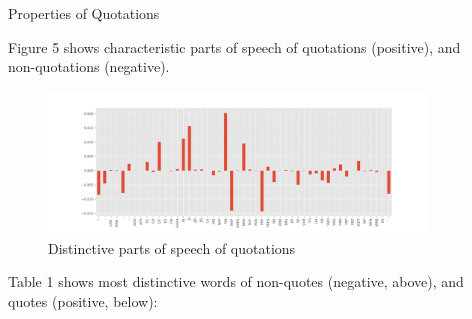 \documentclass[final]{beamer}
\newlength{\sepwid}
\newlength{\onecolwid}
\newlength{\twocolwid}
\begin{document}
\begin{frame}[t]
\begin{columns}[t]
\begin{column}{\twocolwid}
\end{column} %

\begin{column}{\sepwid}\end{column} %

\begin{column}{\onecolwid} %


\begin{block}{Properties of Quotations}

Figure 5 shows characteristic parts of speech of quotations (positive), and non-quotations (negative). 

\begin{figure}
\includegraphics[width=0.9\linewidth]{pos-tags.png}
\caption{Distinctive parts of speech of quotations}
\end{figure}

Table 1 shows most distinctive words of non-quotes (negative, above), and quotes (positive, below): 


\end{block}
\end{column}
\end{columns}
\end{frame}
\end{document}
